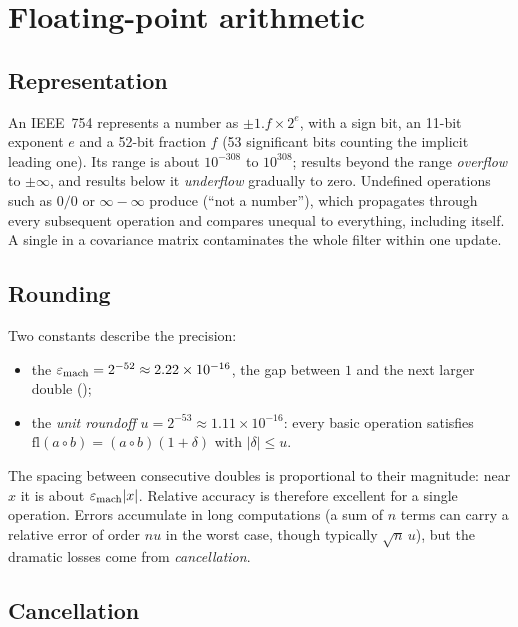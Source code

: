 \section{Floating-point arithmetic}
\label{sec:floating}

\subsection{Representation}

An IEEE~754  represents a number as $\pm1.f\times2^e$, with a sign bit, an 11-bit exponent $e$ and a 52-bit fraction $f$ (53
significant bits counting the implicit leading one). Its range is about $10^{-308}$ to $10^{308}$; results beyond the range \emph{overflow}
to $\pm\infty$, and results below it \emph{underflow} gradually to zero. Undefined operations such as $0/0$ or $\infty - \infty$ produce
 (``not a number''), which propagates through every subsequent operation and compares unequal to everything, including itself.
A single  in a covariance matrix contaminates the whole filter within one update.

\subsection{Rounding}

Two constants describe the precision:
\begin{itemize}
  \item the  $\varepsilon_{\mathrm{mach}} = 2^{-52} \approx 2.22\times10^{-16}$, the gap between $1$ and the next larger double
        ();
  \item the \emph{unit roundoff} $u = 2^{-53} \approx 1.11\times10^{-16}$: every basic operation satisfies
        $\mathrm{fl}(a \circ b) = (a\circ b)(1 + \delta)$ with $|\delta| \le u$.
\end{itemize}
The spacing between consecutive doubles is proportional to their magnitude: near $x$ it is about $\varepsilon_{\mathrm{mach}}|x|$. Relative accuracy is therefore
excellent for a single operation. Errors accumulate in long computations (a sum of $n$ terms can carry a relative error of order $nu$ in the
worst case, though typically $\sqrt n\,u$), but the dramatic losses come from \emph{cancellation}.

\subsection{Cancellation}


